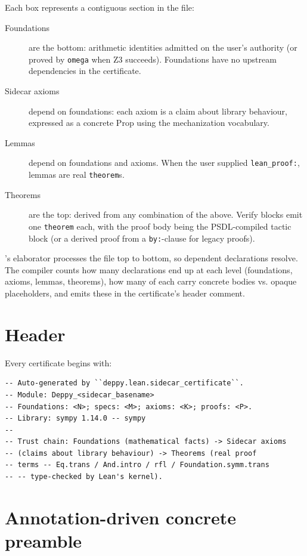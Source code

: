 Each box represents a contiguous section in the \Lean{} file:
\begin{description}
  \item[Foundations] are the bottom: arithmetic identities admitted
  on the user's authority (or proved by \texttt{omega} when Z3
  succeeds).  Foundations have no upstream dependencies in the
  certificate.
  \item[Sidecar axioms] depend on foundations: each axiom is a
  claim about library behaviour, expressed as a concrete \Lean{}
  Prop using the mechanization vocabulary.
  \item[Lemmas] depend on foundations and axioms.  When the user
  supplied \texttt{lean\_proof:}, lemmas are real \texttt{theorem}s.
  \item[Theorems] are the top: derived from any combination of the
  above.  Verify blocks emit one \texttt{theorem} each, with the
  proof body being the PSDL-compiled tactic block (or a derived
  proof from a \texttt{by:}-clause for legacy proofs).
\end{description}

\Lean's elaborator processes the file top to bottom, so dependent
declarations resolve.  The compiler counts how many declarations
end up at each level (foundations, axioms, lemmas, theorems), how
many of each carry concrete bodies vs. opaque placeholders, and
emits these in the certificate's header comment.

\section{Header}

Every certificate begins with:

\begin{lstlisting}[language=lean4]
-- Auto-generated by ``deppy.lean.sidecar_certificate``.
-- Module: Deppy_<sidecar_basename>
-- Foundations: <N>; specs: <M>; axioms: <K>; proofs: <P>.
-- Library: sympy 1.14.0 -- sympy
--
-- Trust chain: Foundations (mathematical facts) -> Sidecar axioms
-- (claims about library behaviour) -> Theorems (real proof
-- terms -- Eq.trans / And.intro / rfl / Foundation.symm.trans
-- -- type-checked by Lean's kernel).
\end{lstlisting}

\section{Annotation-driven concrete preamble}
\label{sec:concrete-preamble}

